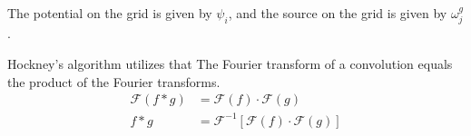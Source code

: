 \documentclass[11pt]{article}
\begin{document}
The potential on the grid is given by \( \psi_i \), and the source on the grid is given by \( \omega^g_j \).


Hockney's algorithm utilizes that The Fourier transform of a convolution equals the product of the Fourier transforms.
\begin{equation*}
    \begin{aligned}
        \mathcal{F} \left( f * g \right) & = \mathcal{F}(f) \cdot \mathcal{F}(g)                                 \\
        f * g                            & = \mathcal{F}^{-1} \left[ \mathcal{F}(f) \cdot \mathcal{F}(g) \right]
    \end{aligned}
\end{equation*}



\vspace{.5in}






\end{document}
